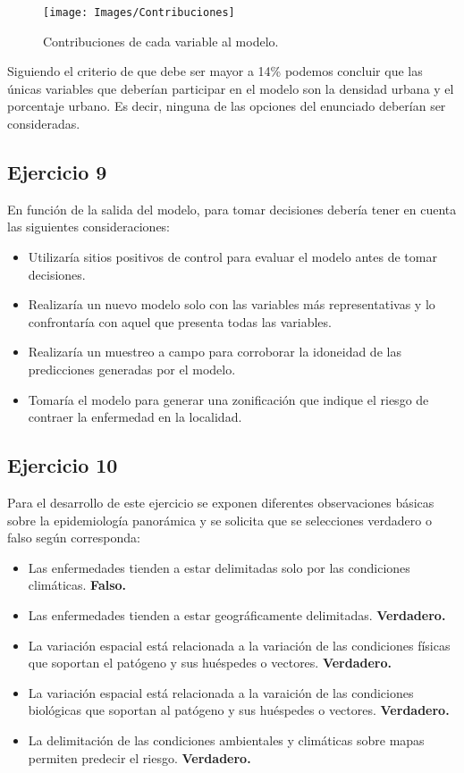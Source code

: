 \begin{figure}[H]
	\centering
	\texttt{[image: Images/Contribuciones]}
	\caption{Contribuciones de cada variable al modelo.}
	\label{fig:contribuciones}
\end{figure}

Siguiendo el criterio de que debe ser mayor a 14\% podemos concluir que las únicas variables que deberían participar en el modelo son la densidad urbana y el porcentaje urbano. Es decir, ninguna de las opciones del enunciado deberían ser consideradas.

\subsection{Ejercicio 9}
En función de la salida del modelo, para tomar decisiones debería tener en cuenta las siguientes consideraciones:

\begin{itemize}
	\item Utilizaría sitios positivos de control para evaluar el modelo antes de tomar decisiones.
	\item Realizaría un nuevo modelo solo con las variables más representativas y lo confrontaría con aquel que presenta todas las variables.
	\item Realizaría un muestreo a campo para corroborar la idoneidad de las predicciones generadas por el modelo.
	\item Tomaría el modelo para generar una zonificación que indique el riesgo de contraer la enfermedad en la localidad.
\end{itemize}

\subsection{Ejercicio 10}
Para el desarrollo de este ejercicio se exponen diferentes observaciones básicas sobre la epidemiología panorámica y se solicita que se selecciones verdadero o falso según corresponda:

\begin{itemize}
	\item Las enfermedades tienden a estar delimitadas solo por las condiciones climáticas. \textbf{Falso.}
	\item Las enfermedades tienden a estar geográficamente delimitadas. \textbf{Verdadero.}
	\item La variación espacial está relacionada a la variación de las condiciones físicas que soportan el patógeno y sus huéspedes o vectores. \textbf{Verdadero.}
	\item La variación espacial está relacionada a la varaición de las condiciones biológicas que soportan al patógeno y sus huéspedes o vectores. \textbf{Verdadero.}
	\item La delimitación de las condiciones ambientales y climáticas sobre mapas permiten predecir el riesgo. \textbf{Verdadero.}
\end{itemize}